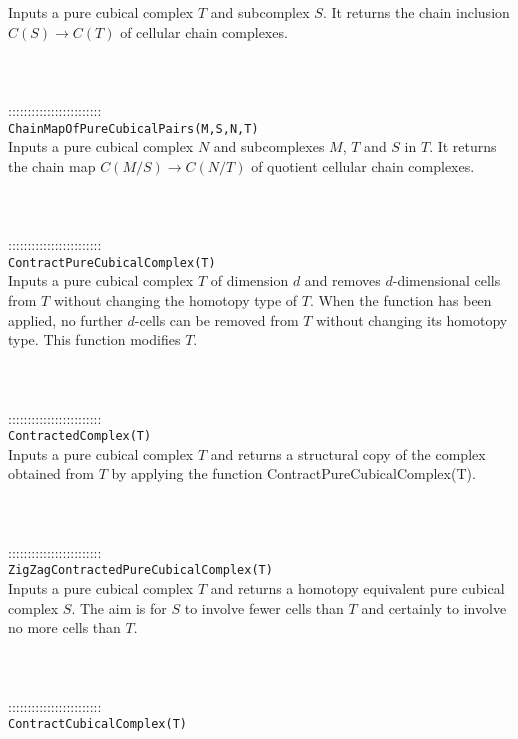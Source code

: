 \documentclass[a4paper,11pt]{report}
\begin{document}
{ Inputs a pure cubical complex $T$ and subcomplex $S$. It returns the chain inclusion $C(S) \rightarrow C(T)$ of cellular chain complexes. \\
 \\
 \\
 \\
 ::::::::::::::::::::::::\\
 \texttt{ChainMapOfPureCubicalPairs(M,S,N,T)}\\
 

 Inputs a pure cubical complex $N$ and subcomplexes $M$, $T$ and $S$ in $T$. It returns the chain map $C(M/S) \rightarrow C(N/T)$ of quotient cellular chain complexes. \\
 \\
 \\
 \\
 ::::::::::::::::::::::::\\
 \texttt{ContractPureCubicalComplex(T)}\\
 

 Inputs a pure cubical complex $T$ of dimension $d$ and removes $d$-dimensional cells from $T$ without changing the homotopy type of $T$. When the function has been applied, no further $d$-cells can be removed from $T$ without changing its homotopy type. This function modifies $T$. \\
 \\
 \\
 \\
 ::::::::::::::::::::::::\\
 \texttt{ContractedComplex(T)}\\
 

 Inputs a pure cubical complex $T$ and returns a structural copy of the complex obtained from $T$ by applying the function ContractPureCubicalComplex(T). \\
 \\
 \\
 \\
 ::::::::::::::::::::::::\\
 \texttt{ZigZagContractedPureCubicalComplex(T)}\\
 

 Inputs a pure cubical complex $T$ and returns a homotopy equivalent pure cubical complex $S$. The aim is for $S$ to involve fewer cells than $T$ and certainly to involve no more cells than $T$. \\
 \\
 \\
 \\
 ::::::::::::::::::::::::\\
 \texttt{ContractCubicalComplex(T)}\\
 

}
\end{document}
